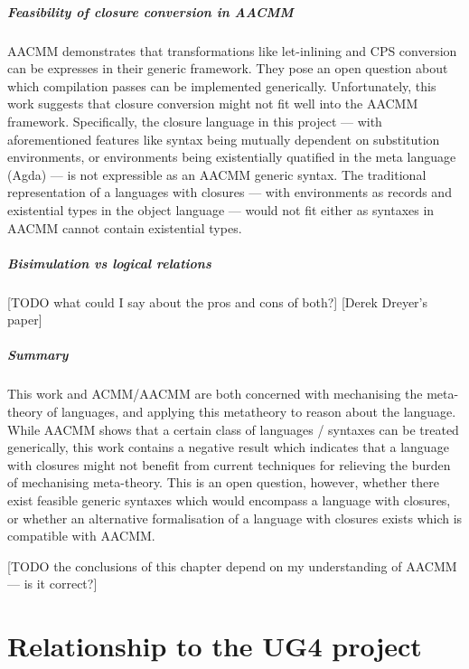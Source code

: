 \documentclass[bsc,frontabs,oneside,singlespacing,parskip,deptreport]{infthesis}
\theoremstyle{definition}
\theoremstyle{lemma}
\begin{document}
\paragraph{Feasibility of closure conversion in AACMM}
AACMM demonstrates that transformations like let-inlining and CPS
conversion can be expresses in their generic framework. They pose an
open question about which compilation passes can be implemented
generically. Unfortunately, this work suggests that closure conversion
might not fit well into the AACMM framework. Specifically, the
closure language in this project --- with aforementioned features like
syntax being mutually dependent on substitution environments, or
environments being existentially quatified in the meta language (Agda)
--- is not expressible as an AACMM generic syntax. The traditional
representation of a languages with closures --- with environments as
records and existential types in the object language --- would not fit
either as syntaxes in AACMM cannot contain existential types.

\paragraph{Bisimulation vs logical relations}
[TODO what could I say about the pros and cons of both?]
[Derek Dreyer's paper]

\paragraph{Summary}
This work and ACMM/AACMM are both concerned with mechanising the
meta-theory of languages, and applying this metatheory to reason about
the language. While AACMM shows that a certain class of languages /
syntaxes can be treated generically, this work contains a negative
result which indicates that a language with closures might not benefit
from current techniques for relieving the burden of mechanising
meta-theory. This is an open question, however, whether there exist
feasible generic syntaxes which would encompass a language with
closures, or whether an alternative formalisation of a language with
closures exists which is compatible with AACMM.

[TODO the conclusions of this chapter depend on my understanding of
AACMM --- is it correct?]

\chapter{Relationship to the UG4 project}
\label{cha:relat-ug4-proj}
\end{document}
